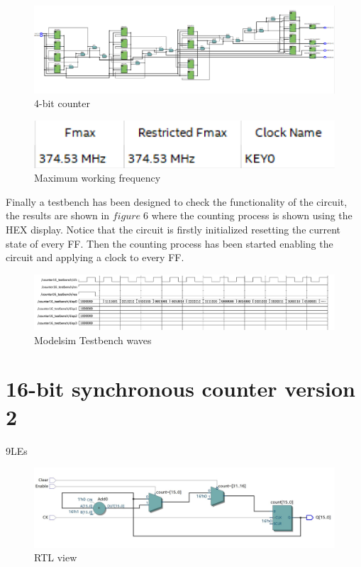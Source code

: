 \documentclass[12pt]{article}
\begin{document}
\begin{figure}[!h]
	\centering
	\includegraphics[scale = 0.4]{immagini/immagine42.PNG}
	\caption{4-bit counter}
\end{figure}
\vspace{10mm}
	\begin{figure}[h]
		\centering
		\includegraphics[scale = 0.9]{immagini/fmax.PNG}
		\caption{Maximum working frequency}
	\end{figure}
\newpage
Finally a testbench has been designed to check the functionality of the circuit, the results are shown in $figure\;6$ where the counting process is shown using the HEX display. Notice that the circuit is firstly initialized resetting the current state of every FF. Then the counting process has been started enabling the circuit and applying a clock to every FF.
		\begin{figure}[h]
			\centering
			\includegraphics[scale = 0.6]{immagini/testbench2.PNG}
			\caption{Modelsim Testbench waves}
\end{figure}
\section{16-bit synchronous counter version 2}
9LEs
\begin{figure}[h]
	\centering
	\includegraphics[scale = 0.6]{immagini/RTB3.jpg}
	\caption{RTL view}
\end{figure}
\end{document}
